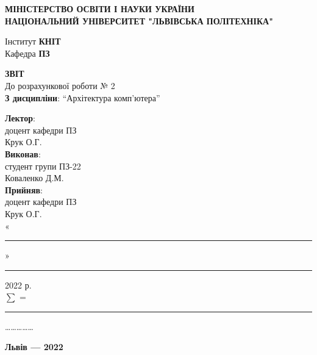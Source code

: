\documentclass{article}
\newcommand\subject{Архітектура комп'ютера}
\newcommand\lecturer{доцент кафедри ПЗ\\Крук О.Г.}
\newcommand\teacher{доцент кафедри ПЗ\\Крук О.Г.}
\newcommand\mygroup{ПЗ-22}
\newcommand\lab{2}
\begin{document}
\begin{normalsize}
	\begin{titlepage}
		\thispagestyle{empty}
		\begin{center}
			\textbf{МІНІСТЕРСТВО ОСВІТИ І НАУКИ УКРАЇНИ\\
				НАЦІОНАЛЬНИЙ УНІВЕРСИТЕТ "ЛЬВІВСЬКА ПОЛІТЕХНІКА"}
		\end{center}
		\begin{flushright}
			Інститут \textbf{КНІТ}\\
			Кафедра \textbf{ПЗ}
		\end{flushright}
		\vspace{200pt}
		\begin{center}
			\textbf{ЗВІТ}\\
			\vspace{10pt}
			До розрахункової роботи № \lab\\
			\textbf{З дисципліни}: “\subject”
		\end{center}
		\vspace{112pt}
		\begin{flushright}
			
			\textbf{Лектор}:\\
			\lecturer\\
			\vspace{28pt}
			\textbf{Виконав}:\\
			
			студент групи \mygroup\\
			Коваленко Д.М.\\
			\vspace{28pt}
			\textbf{Прийняв}:\\
			
			\teacher\\
			
			\vspace{28pt}
			«\rule{1cm}{0.15mm}» \rule{1.5cm}{0.15mm} 2022 р.\\
			$\sum$ = \rule{1cm}{0.15mm}……………\\
			
		\end{flushright}
		\vspace{\fill}
		\begin{center}
			\textbf{Львів — 2022}
		\end{center}
	\end{titlepage}


\end{normalsize}
\end{document}
